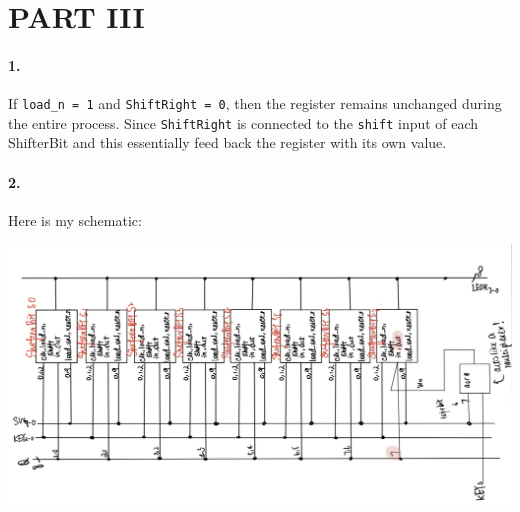 \documentclass[oneside, 10pt]{article}
\begin{document}
\section*{PART III}
\paragraph{1.} If \texttt{load\_n = 1} and \texttt{ShiftRight = 0}, then the 
register remains unchanged during the entire process. Since \texttt{ShiftRight}
is connected to the \texttt{shift} input of each ShifterBit and this essentially 
feed back the register with its own value. 
\paragraph{2.} Here is my schematic:
\begin{center}
    \includegraphics[scale=0.3]{q3_scheme.jpg}
\end{center}
\end{document}
